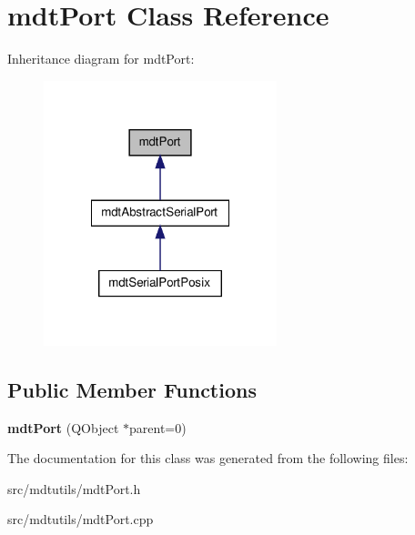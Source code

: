 \hypertarget{classmdt_port}{
\section{mdtPort Class Reference}
\label{classmdt_port}
}


Inheritance diagram for mdtPort:
\nopagebreak
\begin{figure}[H]
\begin{center}
\leavevmode
\includegraphics[width=192pt]{classmdt_port__inherit__graph}
\end{center}
\end{figure}
\subsection*{Public Member Functions}
\begin{DoxyCompactItemize}
\item 
\hypertarget{classmdt_port_ac466eac9d1a54ea0e04c998660ad75ec}{
{\bfseries mdtPort} (QObject $\ast$parent=0)}
\label{classmdt_port_ac466eac9d1a54ea0e04c998660ad75ec}

\end{DoxyCompactItemize}


The documentation for this class was generated from the following files:\begin{DoxyCompactItemize}
\item 
src/mdtutils/mdtPort.h\item 
src/mdtutils/mdtPort.cpp\end{DoxyCompactItemize}
